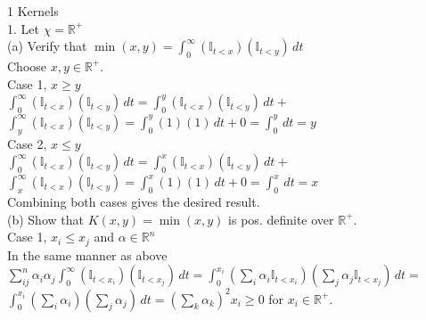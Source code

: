 \documentclass[18pt]{article}
\author{Adam Handwerger}
\begin{document}
\begin{flushleft}
    1 Kernels\\
    \vspace{.4cm}
    1. Let $\chi=\mathbb{R}^{+} $\\
    \vspace{.4cm}
    (a) Verify that $ \min(x,y)=\int_{0}^\infty (\mathbb{I}_{t<x}) (\mathbb{I}_{t<y}) \,dt $\\
    \vspace{.4cm}
    Choose $x,y \in \mathbb{R}^{+}$.\\
    \vspace{.4cm}
    Case 1, $x \geq y$\\
    \vspace{.4cm}
    $\int_{0}^{\infty} (\mathbb{I}_{t<x}) (\mathbb{I}_{t<y}) \,dt=\int_{0}^{y} (\mathbb{I}_{t<x}) (\mathbb{I}_{t<y}) \,dt+$\\
    $\int_{y}^{\infty} (\mathbb{I}_{t<x}) (\mathbb{I}_{t<y})=\int_{0}^{y} (1)(1) \,dt +0= \int_{0}^{y} \,dt=y$\\
    \vspace{.4cm}
    Case 2, $ x\leq y$\\
    \vspace{.4cm}
    $\int_{0}^{\infty} (\mathbb{I}_{t<x}) (\mathbb{I}_{t<y}) \,dt=\int_{0}^{x} (\mathbb{I}_{t<x}) (\mathbb{I}_{t<y}) \,dt+$\\
    $\int_{x}^{\infty} (\mathbb{I}_{t<x}) (\mathbb{I}_{t<y})=\int_{0}^{x} (1)(1) \,dt +0= \int_{0}^{x} \,dt=x$\\
    \vspace{.4cm}
    Combining both cases gives the desired result.\\
    \vspace{.4cm}
    (b) Show that $K(x,y)=\min(x,y)$ is pos. definite over $\mathbb{R}^{+}$.\\
    \vspace{.4cm}
    Case 1, $x_i \leq x_j$ and $\alpha\in\mathbb{R}^n$\\
    \vspace{.4cm}
    In the same manner as above\\
    \vspace{.4cm}
    $\sum_{ij}^n \alpha_i \alpha_j \int_{0}^{\infty} (\mathbb{I}_{t<x_i}) (\mathbb{I}_{t<x_j}) \,dt=\int_{0}^{x_i} (\sum_i \alpha_i \mathbb{I}_{t<x_i}) (\sum_j \alpha_j \mathbb{I}_{t<x_j}) \,dt=$\\
$\int_0^{x_i} (\sum_i \alpha_i)(\sum_j \alpha_j) \,dt=(\sum_k \alpha_k)^2 x_i \geq 0$ for $x_i \in \mathbb{R}^{+}$.\\

\end{flushleft}
\end{document}
